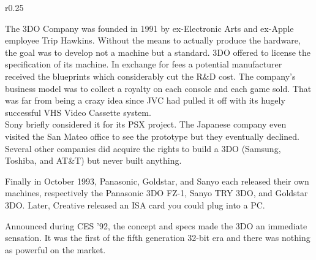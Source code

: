\begin{wrapfigure}[14]{r}{0.25\textwidth}{
\centering {}}
\end{wrapfigure}
The 3DO Company was founded in 1991 by ex-Electronic Arts and ex-Apple employee Trip Hawkins. Without the means to actually produce the hardware, the goal was to develop not a machine but a standard. 3DO offered to license the specification of its machine. In exchange for fees a potential manufacturer received the blueprints which considerably cut the R\&D cost. The company's business model was to collect a royalty on each console and each game sold. That was far from being a crazy idea since JVC had pulled it off with its hugely successful VHS Video Cassette system.\\

 Sony briefly considered it for its PSX project. The Japanese company even visited the San Mateo office to see the prototype but they eventually declined. Several other companies did acquire the rights to build a 3DO (Samsung, Toshiba, and AT\&T) but never built anything.\\
 \par
Finally in October 1993, Panasonic, Goldstar, and Sanyo each released their own machines, respectively the Panasonic 3DO FZ-1, Sanyo TRY 3DO, and Goldstar 3DO. Later, Creative released an ISA card you could plug into a PC.\\
\par
{}
\par
\vspace{-5pt}

















Announced during CES '92, the concept and specs made the 3DO an immediate sensation. It was the first of the fifth generation 32-bit era and there was nothing as powerful on the market.\\
\par


\\

